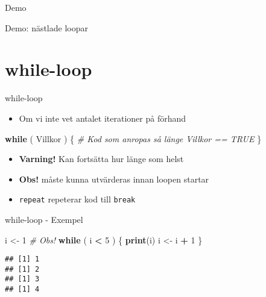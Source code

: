 \documentclass[
  11pt,
  ignorenonframetext,
]{beamer}
\newenvironment{Shaded}{\begin{snugshade}}{\end{snugshade}}
\newcommand{\CommentTok}[1]{\textcolor[rgb]{0.56,0.35,0.01}{\textit{#1}}}
\newcommand{\ControlFlowTok}[1]{\textcolor[rgb]{0.13,0.29,0.53}{\textbf{#1}}}
\newcommand{\DecValTok}[1]{\textcolor[rgb]{0.00,0.00,0.81}{#1}}
\newcommand{\FunctionTok}[1]{\textcolor[rgb]{0.13,0.29,0.53}{\textbf{#1}}}
\newcommand{\NormalTok}[1]{#1}
\newcommand{\OtherTok}[1]{\textcolor[rgb]{0.56,0.35,0.01}{#1}}
\newcommand{\SpecialCharTok}[1]{\textcolor[rgb]{0.81,0.36,0.00}{\textbf{#1}}}
\providecommand{\tightlist}{%
  \setlength{\itemsep}{0pt}\setlength{\parskip}{0pt}}
\newcommand\imp[1]{\alert{\textbf{#1}}}
\begin{document}
\begin{frame}{Demo}
\label{demo-2}
\begin{block}{Demo: nästlade loopar}
\label{demo-nuxe4stlade-loopar}
\end{block}
\end{frame}

\section{while-loop}\label{while-loop}

\begin{frame}[fragile]{while-loop}
\label{while-loop-1}
\begin{itemize}
\tightlist
\item
  Om vi inte vet antalet iterationer på förhand
\end{itemize}

\begin{Shaded}
\begin{Highlighting}[]
\ControlFlowTok{while}\NormalTok{ ( Villkor ) \{}
  \CommentTok{\# Kod som anropas så länge Villkor == TRUE}
\NormalTok{\}}
\end{Highlighting}
\end{Shaded}

\begin{itemize}
\tightlist
\item
  \imp{Varning!} Kan fortsätta hur länge som helst
\item
  \imp{Obs!}  måste kunna utvärderas innan loopen startar
\item
  \texttt{repeat} repeterar kod till \texttt{break}
\end{itemize}
\end{frame}

\begin{frame}[fragile]{while-loop - Exempel}
\label{while-loop---exempel}
\begin{Shaded}
\begin{Highlighting}[]
\NormalTok{i }\OtherTok{\textless{}{-}} \DecValTok{1} \CommentTok{\# Obs!}
\ControlFlowTok{while}\NormalTok{ ( i }\SpecialCharTok{\textless{}} \DecValTok{5}\NormalTok{ ) \{}
  \FunctionTok{print}\NormalTok{(i)}
\NormalTok{  i }\OtherTok{\textless{}{-}}\NormalTok{ i }\SpecialCharTok{+} \DecValTok{1}
\NormalTok{\}}
\end{Highlighting}
\end{Shaded}

\pause

\begin{verbatim}
## [1] 1
## [1] 2
## [1] 3
## [1] 4
\end{verbatim}
\end{frame}
\end{document}
